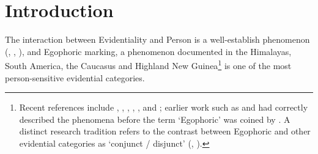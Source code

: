 \documentclass[11pt]{article}
\begin{document}
\section*{Introduction}
The interaction between Evidentiality and Person is a well-establish phenomenon (\citealt[217-238]{aikhenvald06}, \citealt{aikhenvald15evd}, \citealt{sun18evidentials}), and Egophoric marking, a phenomenon documented in the Himalayas, South America, the Caucasus and Highland New Guinea\footnote{Recent references include \citet{tournadre08conjunct}, \citet{hill17evidential}, \citet{delancey18tibetic}, \citet{creissels08akhvakh}, \citet{curnow02conjunct}, \citet{sanroque12evidentiality} and \citet{sanroque17interrogativity}; earlier work such as \citet{yukawa71rinkaku} and \citet{bendix74newari} had correctly described the phenomena before the term `Egophoric' was coined by \citealt{tournadre96erg}.  A distinct research tradition refers to the contrast between Egophoric and other evidential categories as `conjunct / disjunct' (\citealt{hale80conjunct}, \citealt{delancey90erg}).}  is one of the most person-sensitive evidential categories. 

%
%
\end{document}
